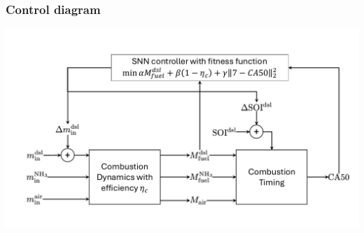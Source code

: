 \documentclass[aspectratio=169, 10pt]{beamer}
\begin{document}
\begin{frame}
\frametitle{Control diagram}
\includegraphics[width=\textwidth]{../Results/figs/control_diagram.pdf}
\end{frame}
\end{document}
